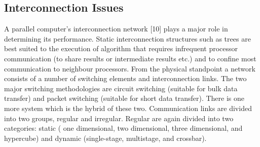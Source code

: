 \subsection{Interconnection Issues}
A parallel computer's interconnection network [10] plays a major role in determining its performance. Static interconnection structures such as trees are best
suited to the execution of algorithm that requires infrequent processor communication (to share results or intermediate results etc.) and to confine most
communication to neighbour processors. From the physical standpoint a network consists of a number of switching elements and interconnection links. The two
major switching methodologies are circuit switching (suitable for bulk data transfer) and packet switching (suitable for short data transfer). There is one
more system which is the hybrid of these two. Communication links are divided into two groups, regular and irregular. Regular are again divided into two
categories: static ( one dimensional, two dimensional, three dimensional, and hypercube)  and dynamic (single-stage, multistage, and crossbar).

